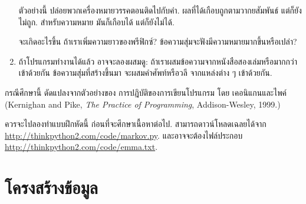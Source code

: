\begin{exercise}
\begin{enumerate}
ตัวอย่างนี้ ปล่อยพวกเครื่องหมายวรรคตอนติดไปกับคำ.
ผลที่ได้เกือบถูกตามวากยสัมพันธ์ แต่ก็ยังไม่ถูก.
สำหรับความหมาย มันก็เกือบได้ แต่ก็ยังไม่ได้.


จะเกิดอะไรขึ้น ถ้าเราเพิ่มความยาวของพรีฟิกซ์?
ข้อความสุ่มจะฟังมีความหมายมากขึ้นหรือเปล่า?


\item ถ้าโปรแกรมทำงานได้แล้ว อาจจะลองผสมดู:
ถ้าเราผสมข้อความจากหนังสือสองเล่มหรือมากกว่าเข้าด้วยกัน
ข้อความสุ่มที่สร้างขึ้นมา จะผสมคำศัพท์หรือวลี จากแหล่งต่าง ๆ เข้าด้วยกัน.

\end{enumerate}


กรณีศึกษานี้ ดัดแปลงจากตัวอย่างของ
การปฎิบัติของการเขียนโปรแกรม โดย เคอนิแกนและไพค์
(Kernighan and
Pike, \textit{The Practice of Programming}, Addison-Wesley, 1999.)

\end{exercise}


ควรจะไปลองทำแบบฝึกหัดนี้ ก่อนที่จะศึกษาเนื้อหาต่อไป.
สามารถดาวน์โหลดเฉลยได้จาก \url{http://thinkpython2.com/code/markov.py}.
และอาจจะต้องไฟล์ประกอบ \url{http://thinkpython2.com/code/emma.txt}.

\section{โครงสร้างข้อมูล}


